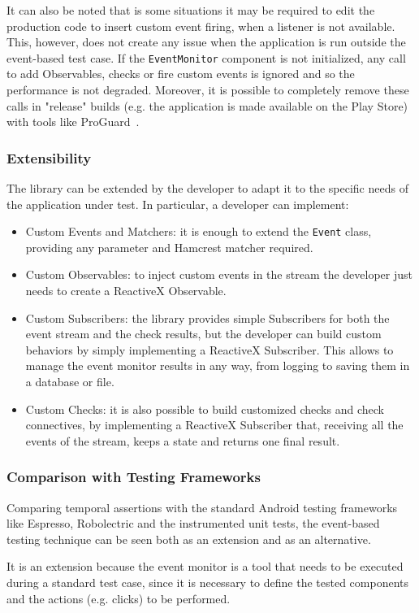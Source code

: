 \documentclass[11pt,a4paper,notitlepage]{article}
\begin{document}
It can also be noted that is some situations it may be required to edit the production code to insert custom event firing, when a listener is not available. This, however, does not create any issue when the application is run outside the event-based test case. If the \texttt{EventMonitor} component is not initialized, any call to add Observables, checks or fire custom events is ignored and so the performance is not degraded. Moreover, it is possible to completely remove these calls in "release" builds (e.g. the application is made available on the Play Store) with tools like ProGuard~\cite{ProGuard}.

\subsubsection{Extensibility}
The library can be extended by the developer to adapt it to the specific needs of the application under test. In particular, a developer can implement:
\begin{itemize}
	\item Custom Events and Matchers: it is enough to extend the \texttt{Event} class, providing any parameter and Hamcrest matcher required.
	\item Custom Observables: to inject custom events in the stream the developer just needs to create a ReactiveX Observable.
	\item Custom Subscribers: the library provides simple Subscribers for both the event stream and the check results, but the developer can build custom behaviors by simply implementing a ReactiveX Subscriber. This allows to manage the event monitor results in any way, from logging to saving them in a database or file.
	\item Custom Checks: it is also possible to build customized checks and check connectives, by implementing a ReactiveX Subscriber that, receiving all the events of the stream, keeps a state and returns one final result.
\end{itemize}

\subsubsection{Comparison with Testing Frameworks}
Comparing temporal assertions with the standard Android testing frameworks like Espresso, Robolectric and the instrumented unit tests, the event-based testing technique can be seen both as an extension and as an alternative.

It is an extension because the event monitor is a tool that needs to be executed during a standard test case, since it is necessary to define the tested components and the actions (e.g. clicks) to be performed.
\end{document}
